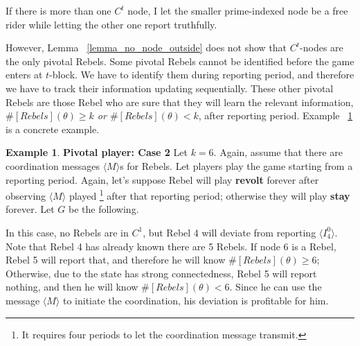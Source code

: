 \documentclass[12pt,letterpaper]{article}
\theoremstyle{definition}
\newtheorem{example}{Example}[section]
\theoremstyle{remark}
\theoremstyle{claim}
\begin{document}
If there is more than one $C^t$ node, I let the smaller prime-indexed node be a free rider while letting the other one report truthfully.

However, Lemma ~\ref{lemma_no_node_outside} does not show that $C^t$-nodes are the only pivotal Rebels. Some pivotal Rebels cannot be identified before the game enters at $t$-block. We have to identify them during reporting period, and therefore we have to track their information updating sequentially. These other pivotal Rebels are those Rebel who are sure that they will learn the relevant information, \textit{$\#[Rebels](\theta)\geq k$ or $\#[Rebels](\theta)< k$}, after reporting period. Example ~\ref{ex_pivotal_2} is a concrete example.

\begin{example} \label{ex_pivotal_2}\textbf{Pivotal player: Case 2}
Let $k=6$. Again, assume that there are coordination messages $\langle M\rangle$s for Rebels. Let players play the game starting from a reporting period. Again, let's suppose Rebel will play \textbf{revolt} forever after observing $\langle M \rangle$ played \footnote{It requires four periods to let the coordination message transmit.} after that reporting period; otherwise they will play \textbf{stay} forever. Let $G$ be the following.

\begin{center}
\end{center}

In this case, no Rebels are in $C^1$, but Rebel 4 will deviate from reporting $\langle I^0_4 \rangle$. Note that Rebel 4 has already known there are 5 Rebels. If node 6 is a Rebel, Rebel 5 will report that, and therefore he will know $\#[Rebels](\theta)\geq 6$; Otherwise, due to the state has strong connectedness, Rebel 5 will report nothing, and then he will know $\#[Rebels](\theta)< 6$. Since he can use the message $\langle M \rangle$ to initiate the coordination, his deviation is profitable for him.
\end{example}
\end{document}
